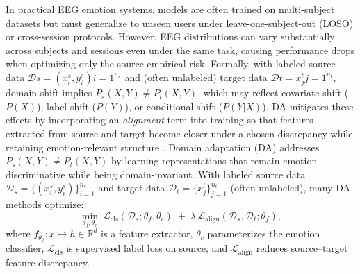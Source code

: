 \documentclass{WileyMSP-template}
\begin{document}
In practical EEG emotion systems, models are often trained on multi-subject datasets but must generalize to unseen users under leave-one-subject-out (LOSO) or cross-session protocols. However, EEG distributions can vary substantially across subjects and sessions even under the same task, causing performance drops when optimizing only the source empirical risk. Formally, with labeled source data $\mathcal{D}s={(x_i^s,y_i^s)}{i=1}^{n_s}$ and (often unlabeled) target data $\mathcal{D}t={x_j^t}{j=1}^{n_t}$, domain shift implies $P_s(X,Y)\neq P_t(X,Y)$, which may reflect covariate shift ($P(X)$), label shift ($P(Y)$), or conditional shift ($P(Y|X)$). DA mitigates these effects by incorporating an \emph{alignment} term into training so that features extracted from source and target become closer under a chosen discrepancy while retaining emotion-relevant structure \cite{wu2020tleeegbci,wan2021tleeegsurvey,li2022transferreview}.
Domain adaptation (DA) addresses $P_s(X,Y)\neq P_t(X,Y)$ by learning representations that remain emotion-discriminative while being domain-invariant. With labeled source data $\mathcal{D}_s=\{(x_i^s,y_i^s)\}_{i=1}^{n_s}$ and target data $\mathcal{D}_t=\{x_j^t\}_{j=1}^{n_t}$ (often unlabeled), many DA methods optimize:
\begin{equation}
\min_{\theta_f,\theta_c}\ \mathcal{L}_{\mathrm{cls}}(\mathcal{D}_s;\theta_f,\theta_c)\;+\;\lambda\,\mathcal{L}_{\mathrm{align}}(\mathcal{D}_s,\mathcal{D}_t;\theta_f),
\label{eq:da_generic_subjectind}
\end{equation}
where $f_{\theta_f}:x\mapsto h\in\mathbb{R}^d$ is a feature extractor, $\theta_c$ parameterizes the emotion classifier, $\mathcal{L}_{\mathrm{cls}}$ is supervised label loss on source, and $\mathcal{L}_{\mathrm{align}}$ reduces source--target feature discrepancy.
\end{document}
